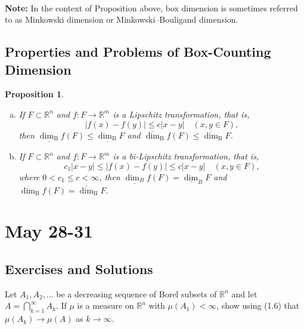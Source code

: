 \documentclass[12pt, a4paper]{article}
\newtheorem{proposition}{Proposition}[subsection]
\begin{document}
\textbf{\\Note: }In the context of Proposition above, box dimension is sometimes referred to as Minkowski dimension or Minkowski–Bouligand dimension.


\newpage
\subsection{Properties and Problems of Box-Counting Dimension}



\begin{proposition}\label{prop2.5} $ $
    \begin{enumerate}[a.]
        \item If $F \subset \mathbb{R}^{n}$ and $f: F \rightarrow \mathbb{R}^{m}$ is a Lipschitz transformation, that is,
        $$
        |f(x)-f(y)| \leq c|x-y| \quad(x, y \in F),
        $$
        then $\underline{\operatorname{dim}_{\mathrm{B}}} f(F) \leq \underline{\operatorname{dim}_{\mathrm{B}}} F$ and $\overline{\operatorname{dim}}_{\mathrm{B}} f(F) \leq \overline{\operatorname{dim}}_{\mathrm{B}} F$.
        
        \item If $F \subset \mathbb{R}^{n}$ and $f: F \rightarrow \mathbb{R}^{m}$ is a bi-Lipschitz transformation, that is,
        $$
        c_{1}|x-y| \leq|f(x)-f(y)| \leq c|x-y| \quad(x, y \in F),
        $$
        where $0<c_{1} \leq c<\infty$, then $\underline{\operatorname{dim}_{B}} f(F)=\underline{\operatorname{dim}}_{B} F$ and
        $\overline{\operatorname{dim}}_{\mathrm{B}} f(F)=\overline{\operatorname{dim}}_{\mathrm{B}} F .$
        
    \end{enumerate}
\end{proposition}


\newpage
\section{May 28-31}
\subsection{Exercises and Solutions}

\begin{customexercise}{1.18}
    Let $A_{1}, A_{2}, \ldots$ be a decreasing sequence of Borel subsets of $\mathbb{R}^{n}$ and let $A=\bigcap_{k=1}^{\infty} A_{k} .$ If $\mu$ is a measure on $\mathbb{R}^{n}$ with $\mu\left(A_{1}\right)<\infty$, show using (1.6) that $\mu\left(A_{k}\right) \rightarrow \mu(A)$ as $k \rightarrow \infty$.
\end{customexercise}
\end{document}
